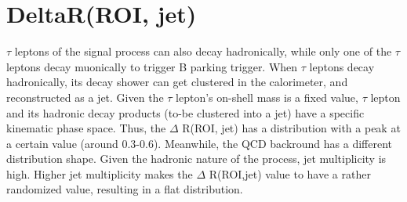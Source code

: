 \section{DeltaR(ROI, jet)}\label{ref:jetdR}
$\tau$ leptons of the signal process can also decay hadronically, while only one of the $\tau$ leptons decay muonically to trigger B parking trigger.
When $\tau$ leptons decay hadronically, its decay shower can get clustered in the calorimeter, and reconstructed as a jet.
Given the $\tau$ lepton's on-shell mass is a fixed value, $\tau$ lepton and its hadronic decay products (to-be clustered into a jet) have a specific kinematic phase space.
Thus, the $\Delta$ R(ROI, jet) has a distribution with a peak at a certain value (around 0.3-0.6).
Meanwhile, the QCD backround has a different distribution shape.
Given the hadronic nature of the process, jet multiplicity is high. 
Higher jet multiplicity makes the $\Delta$ R(ROI,jet) value to have a rather randomized value, resulting in a flat distribution. 


